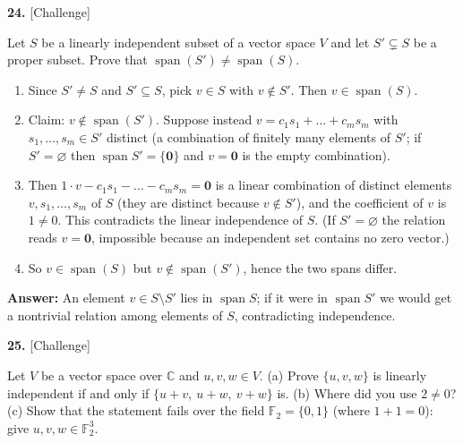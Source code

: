 \documentclass[11pt]{article}
\begin{document}
\par\vspace{2pt}
\begin{minipage}{\linewidth}\textbf{24.} \hfill{\scriptsize\color{ink}[Challenge]}\par\nopagebreak Let $S$ be a linearly independent subset of a vector space $V$ and let $S'\subsetneq S$ be a proper subset. Prove that $\operatorname{span}(S')\neq\operatorname{span}(S)$.
\end{minipage}\par\nopagebreak
\begin{tcolorbox}[breakable,colback=ans,colframe=ansb,boxrule=0.5pt,left=4pt,right=4pt,top=2pt,bottom=2pt]\begin{enumerate}[leftmargin=3.1em,itemsep=1pt,topsep=1pt,label=\textbf{Step \arabic*.}]\item Since $S'\neq S$ and $S'\subseteq S$, pick $v\in S$ with $v\notin S'$. Then $v\in\operatorname{span}(S)$.
\item Claim: $v\notin\operatorname{span}(S')$. Suppose instead $v=c_1s_1+\dots+c_ms_m$ with $s_1,\dots,s_m\in S'$ distinct (a combination of finitely many elements of $S'$; if $S'=\varnothing$ then $\operatorname{span}S'=\{\mathbf 0\}$ and $v=\mathbf 0$ is the empty combination).
\item Then $1\cdot v-c_1s_1-\dots-c_ms_m=\mathbf 0$ is a linear combination of distinct elements $v,s_1,\dots,s_m$ of $S$ (they are distinct because $v\notin S'$), and the coefficient of $v$ is $1\neq0$. This contradicts the linear independence of $S$. (If $S'=\varnothing$ the relation reads $v=\mathbf 0$, impossible because an independent set contains no zero vector.)
\item So $v\in\operatorname{span}(S)$ but $v\notin\operatorname{span}(S')$, hence the two spans differ.
\end{enumerate}\textbf{Answer:} An element $v\in S\setminus S'$ lies in $\operatorname{span}S$; if it were in $\operatorname{span}S'$ we would get a nontrivial relation among elements of $S$, contradicting independence.\end{tcolorbox}
\par\vspace{2pt}
\begin{minipage}{\linewidth}\textbf{25.} \hfill{\scriptsize\color{ink}[Challenge]}\par\nopagebreak Let $V$ be a vector space over $\mathbb{C}$ and $u,v,w\in V$. (a) Prove $\{u,v,w\}$ is linearly independent if and only if $\{u+v,\ u+w,\ v+w\}$ is. (b) Where did you use $2\neq0$? (c) Show that the statement fails over the field $\mathbb{F}_2=\{0,1\}$ (where $1+1=0$): give $u,v,w\in\mathbb{F}_2^{3}$.
\end{minipage}\par\nopagebreak
\end{document}
